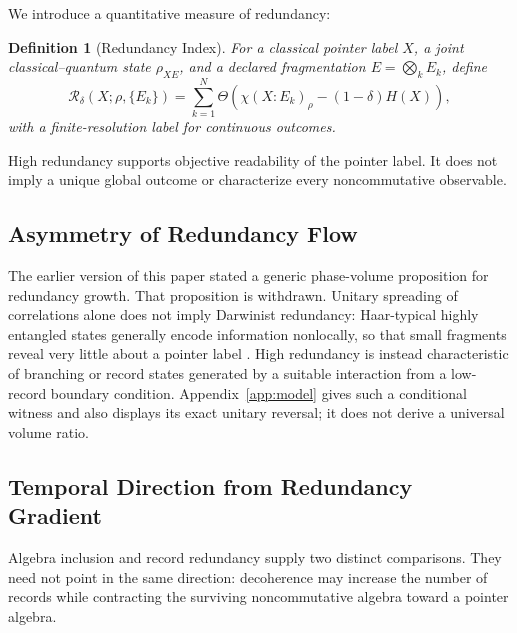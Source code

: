 \documentclass[12pt,a4paper]{article}
\newtheorem{definition}[theorem]{Definition}
\begin{document}
We introduce a quantitative measure of redundancy:

\begin{definition}[Redundancy Index]
\label{def:redundancy}
For a classical pointer label $X$, a joint classical--quantum state $\rho_{XE}$, and a declared fragmentation $E=\bigotimes_kE_k$, define
\begin{equation}
\mathcal{R}_\delta(X;\rho,\{E_k\})
=\sum_{k=1}^{N}\Theta\!\left(
\chi(X:E_k)_\rho-(1-\delta)H(X)\right),
\end{equation}
with a finite-resolution label for continuous outcomes.
\end{definition}

High redundancy supports objective readability of the pointer label.  It does not imply a unique global outcome or characterize every noncommutative observable.

\subsection{Asymmetry of Redundancy Flow}

The earlier version of this paper stated a generic phase-volume proposition for redundancy growth.  That proposition is withdrawn.  Unitary spreading of correlations alone does not imply Darwinist redundancy: Haar-typical highly entangled states generally encode information nonlocally, so that small fragments reveal very little about a pointer label \cite{Page1993,HaydenPreskill2007}.  High redundancy is instead characteristic of branching or record states generated by a suitable interaction from a low-record boundary condition.  Appendix~\ref{app:model} gives such a conditional witness and also displays its exact unitary reversal; it does not derive a universal volume ratio.

\subsection{Temporal Direction from Redundancy Gradient}

Algebra inclusion and record redundancy supply two distinct comparisons.  They need not point in the same direction: decoherence may increase the number of records while contracting the surviving noncommutative algebra toward a pointer algebra.
\end{document}
